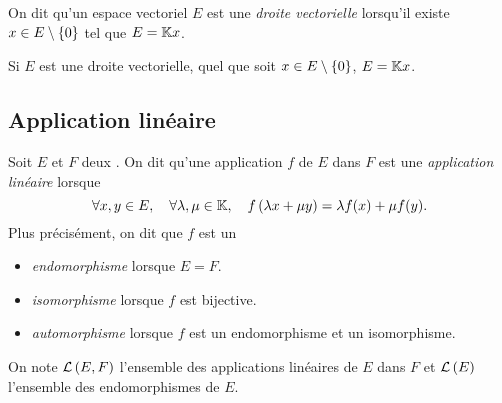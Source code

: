 \documentclass{magnoliaold}
\begin{document}
\begin{definition}
On dit qu'un espace vectoriel $E$ est une \emph{droite vectorielle} lorsqu'il
 existe $x\in E\setminus\left\{0\right\}$ tel que $E=\mathbb{K} x$.
\end{definition}

\begin{remarqueUnique}
\remarque Si $E$ est une droite vectorielle, quel que soit $x\in E\setminus\left\{0\right\}$,
  $E=\mathbb{K} x$.
\end{remarqueUnique}


\subsection{Application linéaire}

\begin{definition}[utile=-3]
Soit $E$ et $F$ deux \Kevs. On dit qu'une application $f$ de $E$ dans $F$ est
une \emph{application linéaire} lorsque
\[\forall x,y\in E ,\quad \forall \lambda,\mu\in\mathbb{K} ,\quad
  f\left(\lambda x+\mu y\right)=\lambda f(x)+\mu f(y).\]
Plus précisément, on dit que $f$ est un
\begin{itemize}
\item \emph{endomorphisme} lorsque $E=F$.
\item \emph{isomorphisme} lorsque $f$ est bijective.
\item \emph{automorphisme} lorsque $f$ est un endomorphisme et un isomorphisme.
\end{itemize}
On note $\mathcal{L}\left(E,F\right)$ l'ensemble des applications linéaires de $E$ dans $F$ et
$\mathcal{L}\left(E\right)$ l'ensemble des endomorphismes de $E$.
\end{definition}
\end{document}

